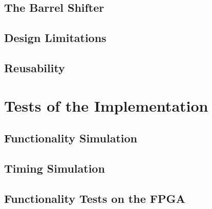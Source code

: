 \documentclass{article}
\begin{document}
\subsection{The Barrel Shifter}
\label{subsec:barrelshifter}

\subsection{Design Limitations}
\label{subsec:limitations}

\subsection{Reusability}
\label{subsec:reusability}





\section{Tests of the Implementation}
\label{sec:tests}

\subsection{Functionality Simulation}
\label{subsec:funcsim}

\subsection{Timing Simulation}
\label{subsec:timingsim}

\subsection{Functionality Tests on the FPGA}
\label{subsec:funcfpga}
\end{document}
